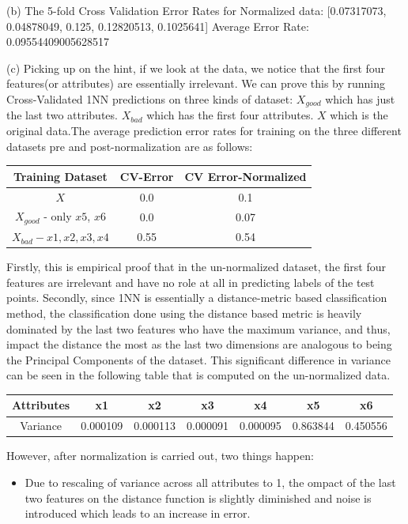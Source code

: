 \documentclass[a4paper]{article}
\theoremstyle{definition}
\newenvironment{soln}{
    \leavevmode\color{blue}\ignorespaces
}{}
\begin{document}
\begin{enumerate}
\begin{soln}
	(b) The 5-fold Cross Validation Error Rates for Normalized data: [0.07317073, 0.04878049, 0.125, 0.12820513, 0.1025641]
	\newline
	Average Error Rate: 0.09554409005628517
	
	(c) Picking up on the hint, if we look at the data, we notice that the first four features(or attributes) are essentially irrelevant.  We can prove this by running Cross-Validated 1NN predictions on three kinds of dataset: $X_{good}$ which has just the last two attributes. $X_{bad}$ which has the first four attributes. $X$ which is the original data.The average prediction error rates for training on the three different datasets pre and post-normalization are as follows:

	\begin{center}
	\begin{tabular}{ccc}\hline
		Training Dataset & CV-Error & CV Error-Normalized \\ \hline
		$X$ & 0.0 & 0.1 \\
		$X_{good}$ - only $x5$, $x6$ & 0.0 & 0.07\\
		$X_{bad} - x1,x2,x3,x4$ & 0.55 & 0.54\\ \hline
	\end{tabular}
	\end{center}


   Firstly, this is empirical proof that in the un-normalized dataset, the first four features are irrelevant and have no role at all in predicting labels of the test points. Secondly, since 1NN is essentially a distance-metric based classification method, the classification done using the distance based metric is heavily dominated by the last two features who have the maximum variance, and thus, impact the distance the most as the last two dimensions are analogous to being the Principal Components of the dataset. This significant difference in variance can be seen in the following table that is computed on the un-normalized data. 
    
    \begin{center}
    \begin{tabular}{ccccccc} \hline
    	Attributes & x1 & x2 & x3 & x4 & x5 & x6 \\ \hline
    	Variance & 0.000109 & 0.000113 & 0.000091 & 0.000095 & 0.863844 & 0.450556 \\ \hline
    \end{tabular}
	\end{center}

	However, after normalization is carried out, two things happen: 
	\begin{itemize}
		\item Due to rescaling of variance across all attributes to 1, the ompact of the last two features on the distance function is slightly diminished and noise is introduced which leads to an increase in error. 
		

\end{itemize}
\end{soln}
\end{enumerate}
\end{document}

